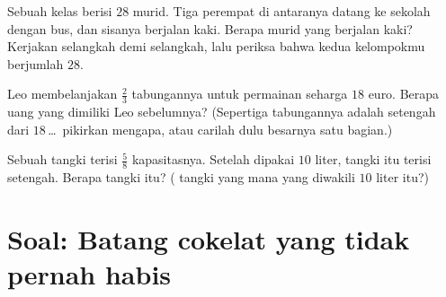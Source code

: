\begin{exercise}[$\star\star$]\label{exo:g6:fractions:10}
Sebuah kelas berisi $28$ murid. Tiga perempat di antaranya datang ke
sekolah dengan bus, dan sisanya berjalan kaki. Berapa murid yang
berjalan kaki? Kerjakan selangkah demi selangkah, lalu periksa bahwa
kedua kelompokmu berjumlah $28$.
\end{exercise}

\begin{exercise}[$\star\star$]\label{exo:g6:fractions:11}
Leo membelanjakan $\frac23$ tabungannya untuk permainan seharga $18$
euro. Berapa uang yang dimiliki Leo sebelumnya? (Sepertiga tabungannya
adalah setengah dari $18$\,\dots\ pikirkan mengapa, atau carilah dulu
besarnya satu bagian.)
\end{exercise}

\begin{exercise}[$\star\star\star$]\label{exo:g6:fractions:12}
Sebuah tangki terisi $\frac58$ kapasitasnya. Setelah dipakai $10$
liter, tangki itu terisi setengah. Berapa  tangki itu?
( tangki yang mana yang diwakili $10$ liter itu?)
\end{exercise}

\section{Soal: Batang cokelat yang tidak pernah habis}

